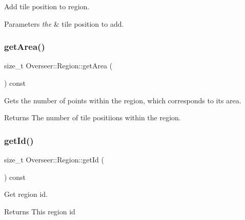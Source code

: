 Add tile position to region. 


\begin{DoxyParams}{Parameters}
{\em the} & tile position to add. \\
\hline
\end{DoxyParams}
\mbox{\label{classOverseer_1_1Region_ae0c44ec954897475619ed302cf5a36e4}} 
\subsubsection{\texorpdfstring{get\+Area()}{getArea()}}
{\footnotesize\ttfamily size\+\_\+t Overseer\+::\+Region\+::get\+Area (\begin{DoxyParamCaption}{ }\end{DoxyParamCaption}) const}



Gets the number of points within the region, which corresponds to it\textquotesingle{}s area. 

\begin{DoxyReturn}{Returns}
The number of tile positiions within the region. 
\end{DoxyReturn}
\mbox{\label{classOverseer_1_1Region_aad3eddafae817b164847dafdf025d13c}} 
\subsubsection{\texorpdfstring{get\+Id()}{getId()}}
{\footnotesize\ttfamily size\+\_\+t Overseer\+::\+Region\+::get\+Id (\begin{DoxyParamCaption}{ }\end{DoxyParamCaption}) const}



Get region id. 

\begin{DoxyReturn}{Returns}
This region id 
\end{DoxyReturn}
\mbox{\label{classOverseer_1_1Region_ac8816d6a083ad2a1fe153390b255ebfe}} 
